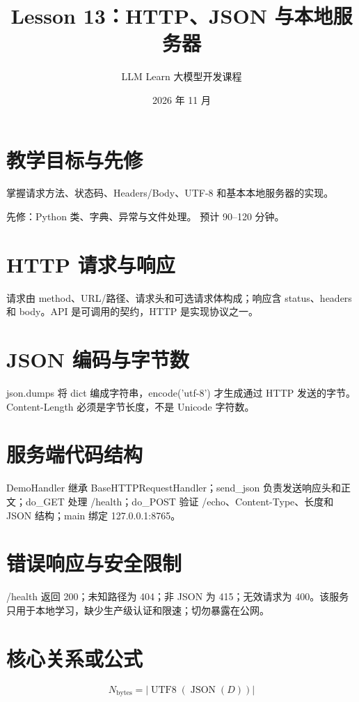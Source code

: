 \documentclass[UTF8,11pt,a4paper]{ctexart}
\begin{document}
\title{Lesson 13：HTTP、JSON 与本地服务器}
\author{LLM Learn 大模型开发课程}
\date{2026 年 11 月}
\maketitle
\tableofcontents
\newpage
\section{教学目标与先修}
掌握请求方法、状态码、Headers/Body、UTF-8 和基本本地服务器的实现。\par
先修：Python 类、字典、异常与文件处理。 预计 90–120 分钟。\par
\section{HTTP 请求与响应}
请求由 method、URL/路径、请求头和可选请求体构成；响应含 status、headers 和 body。API 是可调用的契约，HTTP 是实现协议之一。

\section{JSON 编码与字节数}
json.dumps 将 dict 编成字符串，encode('utf-8') 才生成通过 HTTP 发送的字节。Content-Length 必须是字节长度，不是 Unicode 字符数。

\section{服务端代码结构}
DemoHandler 继承 BaseHTTPRequestHandler；send\_json 负责发送响应头和正文；do\_GET 处理 /health；do\_POST 验证 /echo、Content-Type、长度和 JSON 结构；main 绑定 127.0.0.1:8765。

\section{错误响应与安全限制}
/health 返回 200；未知路径为 404；非 JSON 为 415；无效请求为 400。该服务只用于本地学习，缺少生产级认证和限速；切勿暴露在公网。

\section{核心关系或公式}
\[
N_{\mathrm{bytes}}=\left|\operatorname{UTF8}(\operatorname{JSON}(D))\right|
\]
\end{document}
